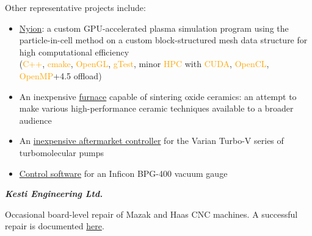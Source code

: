 \documentclass[fleqn,11pt]{article}
\newcommand{\ressection}[1]{\textbf{{\Large \textit{#1}}}\xrfill[0.1ex]{0.6pt}}
\newcommand{\sk}[1]{\textcolor{orange}{#1}}
\newcommand{\itemoptions}{\setlength{\itemindent}{-10pt} \setlength\itemsep{-1em}}
\begin{document}

Other representative projects include:


\begin{itemize}\itemoptions
	\item \href{https://github.com/0xDBFB7/Nyion}{Nyion}: a custom GPU-accelerated plasma simulation program using the particle-in-cell method on a custom block-structured mesh data structure for high computational efficiency\\
	(\sk{C++}, \sk{cmake}, \sk{OpenGL}, \sk{gTest}, minor \sk{HPC} with \sk{CUDA}, \sk{OpenCL}, \sk{OpenMP}+4.5 offload)
	\item An inexpensive \href{https://0xdbfb7.com/furnace.html}{furnace} capable of sintering oxide ceramics: an attempt to make various high-performance ceramic techniques available to a broader audience%
	\item An \href{https://github.com/0xDBFB7/varian-turbo-controller}{inexpensive aftermarket controller} for the Varian Turbo-V series of turbomolecular pumps 
	\item \href{https://gist.github.com/0xDBFB7/7bd7048c6639270e6f291a2673903184}{Control software} for an Inficon BPG-400 vacuum gauge
\end{itemize}








\ressection{Kesti Engineering Ltd.}

Occasional board-level repair of Mazak and Haas CNC machines. A successful repair is documented \href{https://0xdbfb7.com/meldas.html}{here}.

%
%
\end{document}
